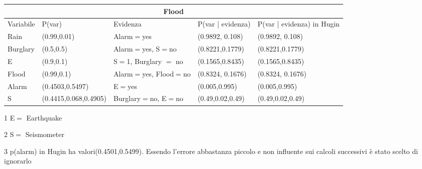 \documentclass{report}
\begin{document}
\newpage
\begin{table}[hbt!]
\small
\hskip-1.0cm\begin{threeparttable}
\begin{tabular}{ |p{2cm}|p{3cm}|p{2cm}|p{3cm}|p{3cm}|  }
\hline
 \multicolumn{5}{|c|}{Flood} \\
 \hline
Variabile & P(var) & Evidenza & P(var | evidenza) & P(var | evidenza)  in Hugin\\
 \hline
Rain &(0.99,0.01) & Alarm$=$yes & (0.9892, 0.108) &(0.9892, 0.108)\\
\hline
Burglary & (0.5,0.5) & Alarm$=$yes, S$=$no & (0.8221,0.1779)& (0.8221,0.1779)\\
\hline
E & (0.9,0.1) & S$=$1, Burglary $=$ no & (0.1565,0.8435) & (0.1565,0.8435)\\
\hline
Flood & (0.99,0.1) & Alarm$=$yes, Flood$=$no & (0.8324, 0.1676) & (0.8324, 0.1676)\\
\hline
Alarm & (0.4503,0.5497) & E$=$yes& (0.005,0.995) & (0.005,0.995)\\
\hline
S & (0.4415,0.068,0.4905) & Burglary$=$no, E$=$no & (0.49,0.02,0.49) &(0.49,0.02,0.49)\\
\hline
\end{tabular}
\begin{tablenotes}
 	    \item[1] E$=$ Earthquake 
        \item[2] S$=$ Seismometer
        \item[3] p(alarm) in Hugin ha valori(0.4501,0.5499). Essendo l'errore abbastanza piccolo e non influente sui calcoli successivi è stato scelto di ignorarlo
 \end{tablenotes}
\end{threeparttable}
\end{table}
\end{document}
